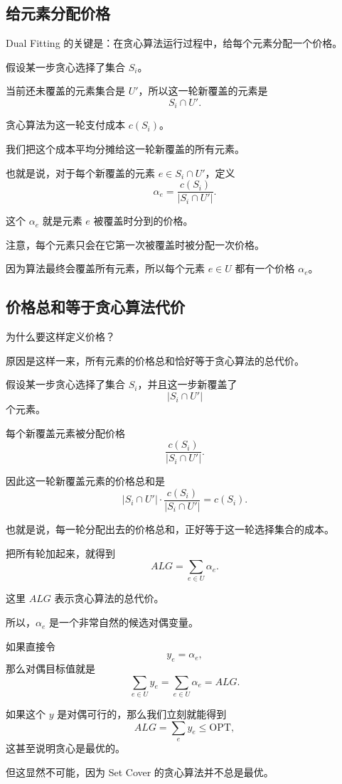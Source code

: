 \documentclass[UTF8,openany,12pt]{ctexbook}
\theoremstyle{remark}
\newcommand{\OPT}{\mathrm{OPT}}
\begin{document}
\subsection{给元素分配价格}

Dual Fitting 的关键是：在贪心算法运行过程中，给每个元素分配一个价格。

假设某一步贪心选择了集合 $S_i$。

当前还未覆盖的元素集合是 $U'$，所以这一轮新覆盖的元素是
\[
  S_i\cap U'.
\]

贪心算法为这一轮支付成本 $c(S_i)$。

我们把这个成本平均分摊给这一轮新覆盖的所有元素。

也就是说，对于每个新覆盖的元素 $e\in S_i\cap U'$，定义
\[
  \alpha_e = \frac{c(S_i)}{|S_i\cap U'|}.
\]

这个 $\alpha_e$ 就是元素 $e$ 被覆盖时分到的价格。

注意，每个元素只会在它第一次被覆盖时被分配一次价格。

因为算法最终会覆盖所有元素，所以每个元素 $e\in U$ 都有一个价格 $\alpha_e$。

\subsection{价格总和等于贪心算法代价}

为什么要这样定义价格？

原因是这样一来，所有元素的价格总和恰好等于贪心算法的总代价。

假设某一步贪心选择了集合 $S_i$，并且这一步新覆盖了
\[
  |S_i\cap U'|
\]
个元素。

每个新覆盖元素被分配价格
\[
  \frac{c(S_i)}{|S_i\cap U'|}.
\]

因此这一轮新覆盖元素的价格总和是
\[
  |S_i\cap U'|\cdot \frac{c(S_i)}{|S_i\cap U'|}
  = c(S_i).
\]

也就是说，每一轮分配出去的价格总和，正好等于这一轮选择集合的成本。

把所有轮加起来，就得到
\[
  ALG = \sum_{e\in U}\alpha_e.
\]

这里 $ALG$ 表示贪心算法的总代价。

所以，$\alpha_e$ 是一个非常自然的候选对偶变量。

如果直接令
\[
  y_e = \alpha_e,
\]
那么对偶目标值就是
\[
  \sum_{e\in U} y_e = \sum_{e\in U}\alpha_e = ALG.
\]

如果这个 $y$ 是对偶可行的，那么我们立刻就能得到
\[
  ALG = \sum_e y_e \le \OPT,
\]
这甚至说明贪心是最优的。

但这显然不可能，因为 Set Cover 的贪心算法并不总是最优。
\end{document}
